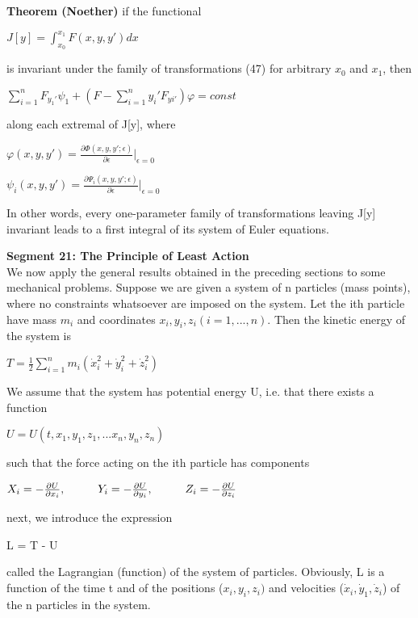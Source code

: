 \documentclass{article}
\newcommand\tab[1][1cm]{\hspace*{#1}}
\begin{document}
\textbf {Theorem (Noether)} if the functional
\begin{center}
$J[y] = \int_{x_0}^{x_1} F(x, y, y') dx$
\end{center}
is invariant under the family of transformations (47) for arbitrary $x_0$ and $x_1$, then
\begin{center}
$\sum_{i=1}^n F_{y_1'} \psi_1 + (F - \sum_{i=1}^n y_i' F_{yi'}) \varphi = const$
\end{center}
along each extremal of J[y], where
\begin{center}
$\varphi(x,y, y') = \frac{\partial \Phi (x, y, y' ; \epsilon)}{\partial \epsilon} |_{\epsilon = 0}$ 
\end{center}
\begin{center}
$\psi_i (x, y, y') = \frac{\partial \Psi_i (x, y, y' ; \epsilon)}{\partial \epsilon} |_{\epsilon = 0}$ 
\end{center}
In other words, every one-parameter family of transformations leaving J[y] invariant leads to a first integral of its system of Euler equations.

\textbf {Segment 21: The Principle of Least Action} \\We now apply the general results obtained in the preceding sections to
some mechanical problems. Suppose we are given a system of n particles (mass points), where no constraints whatsoever are imposed on the system. Let the ith particle have mass $m_i$ and coordinates $x_i , y_i , z_i (i = 1, ... ,n).$
Then the kinetic energy of the system is
\begin{center}
$T = \frac{1}{2} \sum_{i=1}^n m_i (\dot{x}_i^2 + \dot{y}_i^2 + \dot{z}_i^2)$
\end{center}
We assume that the system has potential energy U, i.e. that there exists a function
\begin{center}
$U = U(t, x_1, y_1, z_1 ,... x_n, y_n , z_n)$
\end{center}
such that the force acting on the ith particle has components
\begin{center}
$X_i = -\frac{\partial U}{\partial x_i}, \tab Y_i = -\frac{\partial U}{\partial y_i}, \tab Z_i = -\frac{\partial U}{\partial z_i}$
\end{center}
next, we introduce the expression
\begin{center}
L = T - U
\end{center}
called the Lagrangian (function) of the system of particles. Obviously, L is a function of the time t and of the positions ($x_i, y_i, z_i)$ and velocities ($\dot{x}_i, \dot{y}_1 , \dot{z}_i$) of the n particles in the system.
\end{document}
